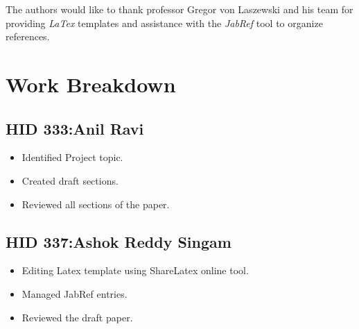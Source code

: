 \documentclass[sigconf]{acmart}
\begin{document}
\begin{acks}

  The authors would like to thank professor Gregor von Laszewski and his team for providing \textit{LaTex} templates and assistance with the \textit{JabRef} tool to organize references.


\end{acks}


 
\newpage
\appendix
\section{Work Breakdown}
\subsection{HID 333:Anil Ravi}
\begin{itemize}
  \item Identified Project topic.
  \item Created draft sections.
  \item Reviewed all sections of the paper.
\end{itemize}
\subsection{HID 337:Ashok Reddy Singam}
\begin{itemize}
  \item Editing Latex template using ShareLatex online tool.
  \item Managed JabRef entries.
  \item Reviewed the draft paper.
\end{itemize}
\end{document}
